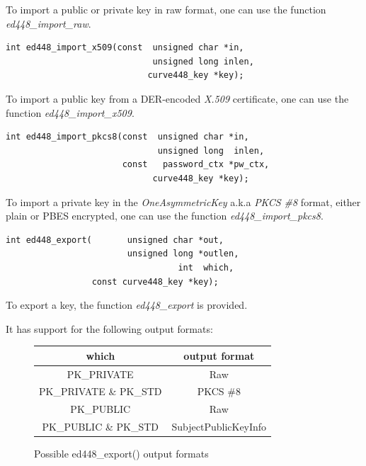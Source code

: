 \documentclass[synpaper]{book}
\begin{document}
To import a public or private key in raw format, one can use the function \textit{ed448\_import\_raw}.

\begin{verbatim}
int ed448_import_x509(const  unsigned char *in,
                             unsigned long inlen,
                            curve448_key *key);
\end{verbatim}

To import a public key from a DER-encoded \textit{X.509} certificate, one can use the function \textit{ed448\_import\_x509}.

\begin{verbatim}
int ed448_import_pkcs8(const  unsigned char *in,
                              unsigned long  inlen,
                       const   password_ctx *pw_ctx,
                             curve448_key *key);
\end{verbatim}

To import a private key in the \textit{OneAsymmetricKey} a.k.a \textit{PKCS \#8} format, either plain or PBES encrypted,
one can use the function \textit{ed448\_import\_pkcs8}.

\begin{verbatim}
int ed448_export(       unsigned char *out,
                        unsigned long *outlen,
                                  int  which,
                 const curve448_key *key);
\end{verbatim}

To export a key, the function \textit{ed448\_export} is provided.

It has support for the following output formats:

\begin{figure}[H]
\begin{center}
\begin{tabular}{|c|c|}
\hline \textbf{which} & \textbf{output format} \\
\hline PK\_PRIVATE & Raw \\
\hline PK\_PRIVATE \& PK\_STD & PKCS \#8 \\
\hline PK\_PUBLIC & Raw \\
\hline PK\_PUBLIC \& PK\_STD & SubjectPublicKeyInfo \\
\hline
\end{tabular}
\end{center}
\caption{Possible ed448\_export() output formats}
\end{figure}
\end{document}
